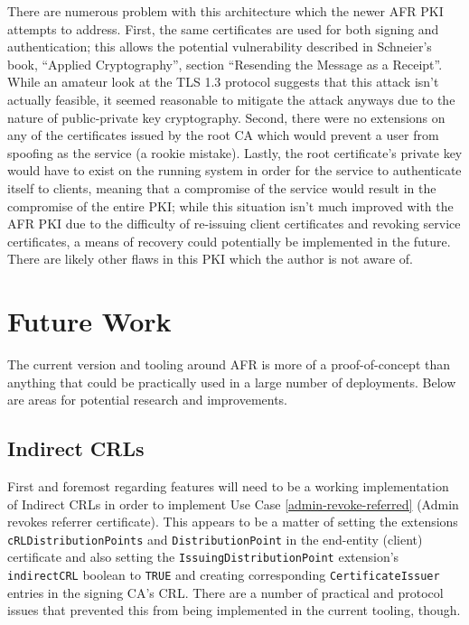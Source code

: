\documentclass{article}
\begin{document}
There are numerous problem with this architecture which the newer AFR PKI attempts to address.  First, the same certificates are used for both signing and authentication; this allows the potential vulnerability described in Schneier's book, ``Applied Cryptography'', section ``Resending the Message as a Receipt''.  While an amateur look at the TLS 1.3 protocol suggests that this attack isn't actually feasible, it seemed reasonable to mitigate the attack anyways due to the nature of public-private key cryptography.  Second, there were no extensions on any of the certificates issued by the root CA which would prevent a user from spoofing as the service (a rookie mistake).  Lastly, the root certificate's private key would have to exist on the running system in order for the service to authenticate itself to clients, meaning that a compromise of the service would result in the compromise of the entire PKI; while this situation isn't much improved with the AFR PKI due to the difficulty of re-issuing client certificates and revoking service certificates, a means of recovery could potentially be implemented in the future.  There are likely other flaws in this PKI which the author is not aware of.

\section{Future Work}

The current version and tooling around AFR is more of a proof-of-concept than anything that could be practically used in a large number of deployments.  Below are areas for potential research and improvements.

\subsection{Indirect CRLs}

First and foremost regarding features will need to be a working implementation of Indirect CRLs in order to implement Use Case \ref{admin-revoke-referred} (Admin revokes referrer certificate).  This appears to be a matter of setting the extensions \texttt{cRLDistributionPoints} and \texttt{DistributionPoint} in the end-entity (client) certificate and also setting the \texttt{IssuingDistributionPoint} extension's \texttt{indirectCRL} boolean to \texttt{TRUE} and creating corresponding \texttt{CertificateIssuer} entries in the signing CA's CRL.  There are a number of practical and protocol issues that prevented this from being implemented in the current tooling, though.
\end{document}
